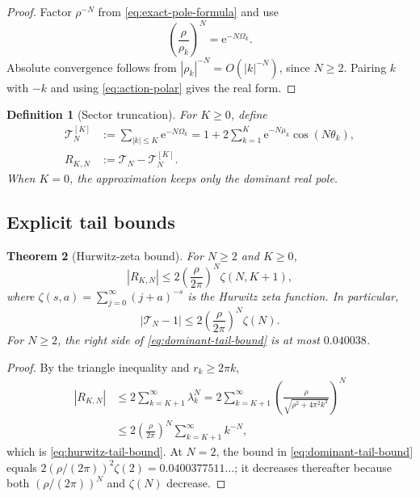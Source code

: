 \documentclass[11pt,oneside]{article}
\numberwithin{equation}{section}
\newtheorem{theorem}{Theorem}[section]
\newtheorem{definition}[theorem]{Definition}
\newcommand{\e}{\mathrm e}
\newcommand{\abs}[1]{\left|#1\right|}
\newcommand{\paren}[1]{\left(#1\right)}
\begin{document}
\begin{proof}
Factor \(\rho^{-N}\) from \cref{eq:exact-pole-formula} and use
\[
 \paren{\frac{\rho}{\rho_k}}^N=\e^{-N\Omega_k}.
\]
Absolute convergence follows from \(\abs{\rho_k}^{-N}=O(\abs{k}^{-N})\), since \(N\ge2\).  Pairing \(k\) with \(-k\) and using \cref{eq:action-polar} gives the real form.
\end{proof}

\begin{definition}[Sector truncation]
For \(K\ge0\), define
\begin{align}
 \mathscr T_N^{[K]}
 &:=\sum_{\abs{k}\le K}\e^{-N\Omega_k}
 =1+2\sum_{k=1}^{K}\e^{-N\mu_k}\cos(N\theta_k),
 \label{eq:sector-truncation}\\
 R_{K,N}&:=\mathscr T_N-\mathscr T_N^{[K]}.
 \label{eq:sector-remainder}
\end{align}
When \(K=0\), the approximation keeps only the dominant real pole.
\end{definition}

\subsection{Explicit tail bounds}

\begin{theorem}[Hurwitz-zeta bound]
\label{thm:hurwitz-bound}
For \(N\ge2\) and \(K\ge0\),
\begin{equation}
 \boxed{\displaystyle
 \abs{R_{K,N}}
 \le 2\paren{\frac{\rho}{2\pi}}^N\zeta(N,K+1),}
 \label{eq:hurwitz-tail-bound}
\end{equation}
where \(\zeta(s,a)=\sum_{j=0}^{\infty}(j+a)^{-s}\) is the Hurwitz zeta function.  In particular,
\begin{equation}
 \abs{\mathscr T_N-1}
 \le 2\paren{\frac{\rho}{2\pi}}^N\zeta(N).
 \label{eq:dominant-tail-bound}
\end{equation}
For \(N\ge2\), the right side of \cref{eq:dominant-tail-bound} is at most
\(0.040038\).
\end{theorem}

\begin{proof}
By the triangle inequality and \(r_k\ge2\pi k\),
\begin{align*}
 \abs{R_{K,N}}
 &\le2\sum_{k=K+1}^{\infty}\lambda_k^N
 =2\sum_{k=K+1}^{\infty}
   \paren{\frac{\rho}{\sqrt{\rho^2+4\pi^2k^2}}}^{N}\\
 &\le2\paren{\frac{\rho}{2\pi}}^N
   \sum_{k=K+1}^{\infty}k^{-N},
\end{align*}
which is \cref{eq:hurwitz-tail-bound}.  At \(N=2\), the bound in
\cref{eq:dominant-tail-bound} equals
\(2(\rho/(2\pi))^2\zeta(2)=0.0400377511\ldots\); it decreases thereafter because both \((\rho/(2\pi))^N\) and \(\zeta(N)\) decrease.
\end{proof}
\end{document}
